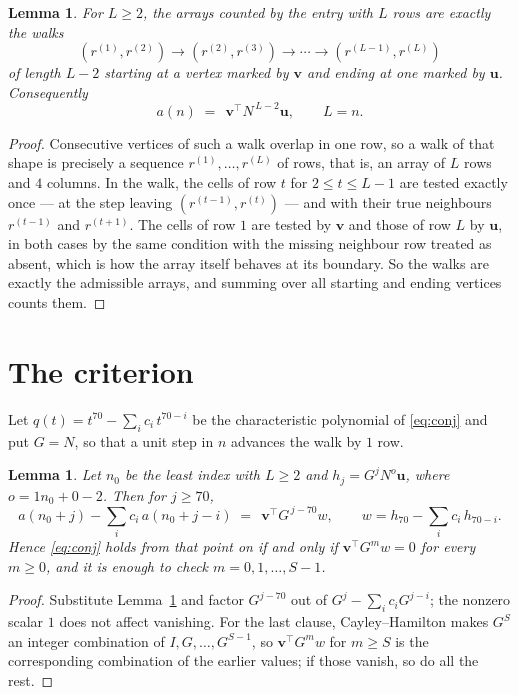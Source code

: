 \documentclass[11pt,a4paper]{article}
\theoremstyle{plain}
\newtheorem{lemma}[theorem]{Lemma}
\theoremstyle{definition}
\begin{document}
\begin{lemma}\label{lem:walk}
For $L\ge2$, the arrays counted by the entry with $L$ rows are exactly the walks
\[
(r^{(1)},r^{(2)})\to(r^{(2)},r^{(3)})\to\cdots\to(r^{(L-1)},r^{(L)})
\]
of length $L-2$ starting at a vertex marked by $\mathbf{v}$ and ending at one marked by
$\mathbf{u}$. Consequently
\[
a(n)\;=\;\,\mathbf{v}^{\!\top}N^{\,L-2}\mathbf{u},\qquad L=n .
\]
\end{lemma}

\begin{proof}
Consecutive vertices of such a walk overlap in one row, so a walk of that shape is
precisely a sequence $r^{(1)},\dots,r^{(L)}$ of rows, that is, an array of $L$ rows
and $4$ columns. In the walk, the cells of row $t$ for $2\le t\le L-1$ are tested
exactly once --- at the step leaving $(r^{(t-1)},r^{(t)})$ --- and with their true
neighbours $r^{(t-1)}$ and $r^{(t+1)}$. The cells of row $1$ are tested by
$\mathbf{v}$ and those of row $L$ by $\mathbf{u}$, in both cases by the same condition
with the missing neighbour row treated as absent, which is how the array itself behaves at
its boundary. So the walks are exactly the admissible arrays, and summing over all starting
and ending vertices counts them.
\end{proof}

\section{The criterion}

Let $q(t)=t^{70}-\sum_i c_i\,t^{70-i}$ be the characteristic polynomial of
\eqref{eq:conj} and put $G=N$, so that a unit step in $n$ advances the walk by
$1$ row.

\begin{lemma}\label{lem:crit}
Let $n_0$ be the least index with $L\ge2$ and $h_j=G^{j}N^{o}\mathbf{u}$, where
$o=1n_0+0-2$. Then for $j\ge70$,
\[
a(n_0+j)-\sum_i c_i\,a(n_0+j-i)\;=\;\,\mathbf{v}^{\!\top}G^{\,j-70}w,
\qquad w=h_{70}-\sum_i c_i\,h_{70-i} .
\]
Hence \eqref{eq:conj} holds from that point on if and only if
$\mathbf{v}^{\!\top}G^{m}w=0$ for every $m\ge0$, and it is enough to check
$m=0,1,\dots,S-1$.
\end{lemma}

\begin{proof}
Substitute Lemma~\ref{lem:walk} and factor $G^{j-70}$ out of
$G^{j}-\sum_ic_iG^{j-i}$; the nonzero scalar $1$ does not affect
vanishing. For the last clause, Cayley--Hamilton makes $G^{S}$ an integer combination of
$I,G,\dots,G^{S-1}$, so $\mathbf{v}^{\!\top}G^{m}w$ for $m\ge S$ is the corresponding
combination of the earlier values; if those vanish, so do all the rest.
\end{proof}
\end{document}
